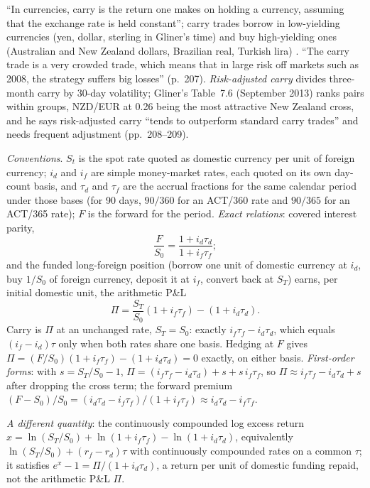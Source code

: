 \begin{qfmodel}\label{mod:fx-carry-trade}
 ``In currencies, carry is the return one makes on holding a currency, assuming that the exchange rate is held constant''; carry trades borrow in low-yielding currencies (yen, dollar, sterling in Gliner's time) and buy high-yielding ones (Australian and New Zealand dollars, Brazilian real, Turkish lira) \citep[chap.~7, sec.\ ``Carry Indicators for Currency Valuation'', PDF pp.~206--207]{s7-gliner}. ``The carry trade is a very crowded trade, which means that in large risk off markets such as 2008, the strategy suffers big losses'' (p.~207). \emph{Risk-adjusted carry} divides three-month carry by 30-day volatility; Gliner's Table~7.6 (September 2013) ranks pairs within groups, NZD/EUR at 0.26 being the most attractive New Zealand cross, and he says risk-adjusted carry ``tends to outperform standard carry trades'' and needs frequent adjustment (pp.~208--209).

 \emph{Conventions}. $S_t$ is the spot rate quoted as domestic currency per unit of foreign currency; $i_d$ and $i_f$ are simple money-market rates, each quoted on its own day-count basis, and $\tau_d$ and $\tau_f$ are the accrual fractions for the same calendar period under those bases (for 90 days, $90/360$ for an ACT/360 rate and $90/365$ for an ACT/365 rate); $F$ is the forward for the period. \emph{Exact relations}: covered interest parity,
\[ \frac{F}{S_0}=\frac{1+i_d\tau_d}{1+i_f\tau_f}; \]
and the funded long-foreign position (borrow one unit of domestic currency at $i_d$, buy $1/S_0$ of foreign currency, deposit it at $i_f$, convert back at $S_T$) earns, per initial domestic unit, the arithmetic P\&L
\[ \Pi=\frac{S_T}{S_0}(1+i_f\tau_f)-(1+i_d\tau_d). \]
Carry is $\Pi$ at an unchanged rate, $S_T=S_0$: exactly $i_f\tau_f-i_d\tau_d$, which equals $(i_f-i_d)\tau$ only when both rates share one basis. Hedging at $F$ gives $\Pi=(F/S_0)(1+i_f\tau_f)-(1+i_d\tau_d)=0$ exactly, on either basis. \emph{First-order forms}: with $s=S_T/S_0-1$, $\Pi=(i_f\tau_f-i_d\tau_d)+s+s\,i_f\tau_f$, so $\Pi\approx i_f\tau_f-i_d\tau_d+s$ after dropping the cross term; the forward premium $(F-S_0)/S_0=(i_d\tau_d-i_f\tau_f)/(1+i_f\tau_f)\approx i_d\tau_d-i_f\tau_f$.

\emph{A different quantity}: the continuously compounded log excess return $x=\ln(S_T/S_0)+\ln(1+i_f\tau_f)-\ln(1+i_d\tau_d)$, equivalently $\ln(S_T/S_0)+(r_f-r_d)\tau$ with continuously compounded rates on a common $\tau$; it satisfies $e^x-1=\Pi/(1+i_d\tau_d)$, a return per unit of domestic funding repaid, not the arithmetic P\&L $\Pi$.


\end{qfmodel}
